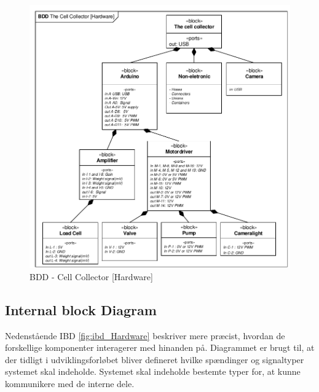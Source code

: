 \begin{figure}[H]
	\centering
	\includegraphics[width=1\textwidth]{pdf/BDD_Hardware.pdf}
	\caption{BDD - Cell Collector [Hardware]}
	\label{fig:bdd_Hardware}
\end{figure}
	
\newpage
\subsection{Internal block Diagram} 
Nedenstående IBD \ref{fig:ibd_Hardware} beskriver mere præcist, hvordan de forskellige komponenter interagerer med hinanden på. Diagrammet er brugt til, at der tidligt i udviklingsforløbet bliver defineret hvilke spændinger og signaltyper systemet skal indeholde. Systemet skal indeholde bestemte typer for, at kunne kommunikere med de interne dele.


